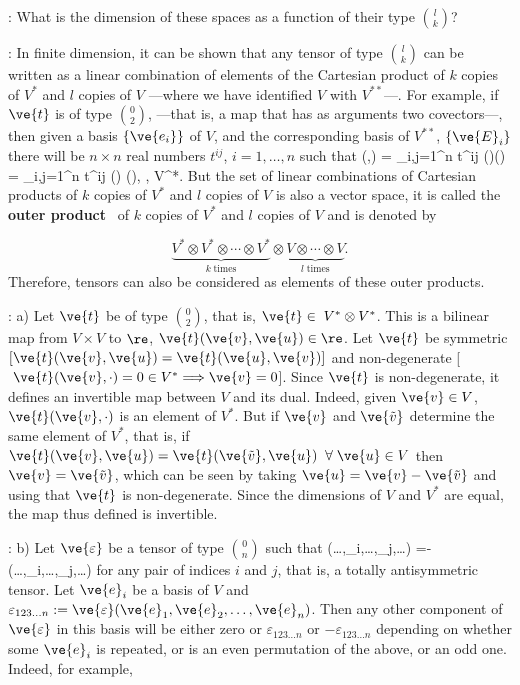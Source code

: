 \ejer: What is the dimension of these spaces as a function of their type ${l \choose k}$?

\noi{}:
In finite dimension, it can be shown that any tensor of type ${l \choose k}$
can be written as a linear combination of elements of the Cartesian product of $k$ copies of $V^*$ and $l$ copies of $V$ 
---where we have identified $V$ with $V^{**}$---. 
For example, if $\ve{t}$ is of type ${0 \choose 2}$, ---that is, a map that has as arguments two covectors---, 
then given a basis $\{\ve{e_{i}}\}$ of $V$, and the corresponding basis of $V^{**}$, $\{\ve{E}_{i}\}$ there will be $n \times n$ real numbers $t^{ij}$, $i=1, \ldots ,n$ such that 
\beq
{}(\ve{\sigma},\ve{\omega}) = 
\sum_{i,j=1}^{n} t^{ij} (\ve{\sigma})(\ve{\omega})
=
\sum_{i,j=1}^{n} t^{ij} \ve{\sigma}() \ve{\omega}(), 
\;\;\;\; \forall \ve{\sigma},\;\ve{\omega} \in V^*.
\eeq
%
But the set of linear combinations of Cartesian products of
$k$ copies of $V^*$ and $l$ copies of $V$ is also a vector
space, it is called the {\bf outer product}~ 
of  $k$ copies of $V^*$ and $l$ copies of $V$ and is denoted by 

\[
\underbrace{V^*\otimes V^*\otimes\cdots\otimes V^*}_{k\;\mbox{times}}
\otimes\underbrace{ V\otimes \cdots\otimes V}_{l\;\mbox{times}}.
\]
%
Therefore, tensors can also be considered as elements
of these outer products.

\ejem: a) Let $\ve{ t}$ be of type ${0 \choose 2}$, that is, $\ve{ t}\in\;V^*\otimes V^*$. 
This is a bilinear map from $V\times V$ to $\re$, $\ve{ t}(\ve{v},\ve{u})\in \re$. Let
$\ve{ t}$ be symmetric $[\ve{ t}(\ve{v},\ve{u})=\ve{ t}(\ve{u},\ve{v})]$ and non-degenerate 
[$\; \ve{ t}(\ve{v},\cdot)= 0
\in V^*\Longrightarrow \ve{v}=0$]. 
Since $\ve{ t}$ is non-degenerate, it defines an invertible map between $V$ and its dual. 
Indeed, given $\ve{v} \in V$, $\ve{t}(\ve{v},\cdot)$ is an element of $V^*$. 
But if $\ve{v}$ and $\ve{\tilde{v}}$ determine the same element of $V^*$, that is, if $\ve{ t}(\ve{v},\ve{u}) = \ve{ t}(\ve{\tilde{v}},\ve{u}) \;\; \forall \; \ve{u} \in V$ then $\ve{v}=\ve{\tilde{v}}$, which can be seen by taking $\ve{u} = \ve{v} - \ve{\tilde{v}}$ and using that $\ve{t}$ is non-degenerate. Since the dimensions of $V$ and $V^{*}$ are equal, the map thus defined is invertible.

\ejem: b) Let $\ve{\varepsilon}$ be a tensor of type ${0 \choose n}$ such that \beq \ve{\varepsilon} (\ldots,_i,\ldots,_j,\ldots) =-\ve{\varepsilon} (\ldots,_i,\ldots,_j,\ldots) \eeq \noi for any pair of indices $i$ and $j$, that is, a totally antisymmetric tensor. Let ${\ve{e}_i}$ be a basis of $V$ and $\varepsilon_{123\ldots n}:= \ve{\varepsilon} (\ve{e}_1,\ve{e}_2,\ldots,\ve{e}_n)$. Then any other component of $\ve{\varepsilon}$ in this basis will be either zero or $\varepsilon_{123\ldots n}$ or $-\varepsilon_{123\ldots n}$ depending on whether some $\ve{e}_i$ is repeated, or is an even permutation of the above, or an odd one. Indeed, for example,

